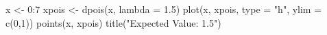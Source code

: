 \begin{Schunk}
\begin{Sinput}
 x <- 0:7
 xpois <- dpois(x, lambda = 1.5)
 plot(x, xpois, type = "h", ylim = c(0,1))
 points(x, xpois)
 title("Expected Value: 1.5")
\end{Sinput}
\end{Schunk}
